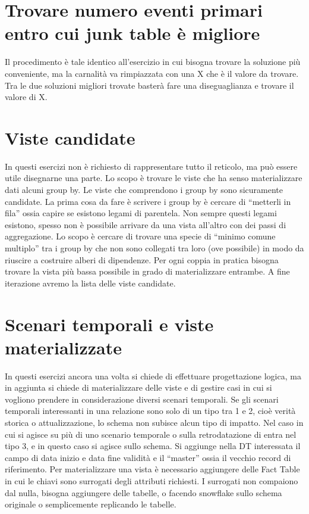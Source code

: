 \section{Trovare numero eventi primari entro cui junk table è migliore}
Il procedimento è tale identico all’esercizio in cui bisogna trovare la soluzione più conveniente, ma la carnalità va rimpiazzata con una X che è il valore da trovare. Tra le due soluzioni migliori trovate basterà fare una diseguaglianza e trovare il valore di X.
\section{Viste candidate}
In questi esercizi non è richiesto di rappresentare tutto il reticolo, ma può essere utile disegnarne una parte.  Lo scopo è trovare le viste che ha senso materializzare dati alcuni group by. Le viste che comprendono i group by sono sicuramente candidate. La prima cosa da fare è scrivere i group by è cercare di “metterli in fila” ossia capire se esistono legami di parentela. Non sempre questi legami esistono, spesso non è possibile arrivare da una vista all’altro con dei passi di aggregazione. Lo scopo è cercare di trovare una specie di “minimo comune multiplo” tra i group by che non sono collegati tra loro (ove possibile) in modo da riuscire a costruire alberi di dipendenze. Per ogni coppia in pratica bisogna trovare la vista più bassa possibile in grado di materializzare entrambe. A fine iterazione avremo la lista delle viste candidate.
\section{Scenari temporali e viste materializzate}
In questi esercizi ancora una volta si chiede di effettuare progettazione logica, ma in aggiunta si chiede di materializzare delle viste e di gestire casi in cui si vogliono prendere in considerazione diversi scenari temporali. Se gli scenari temporali interessanti in una relazione sono solo di un tipo tra 1 e 2, cioè verità storica o attualizzazione, lo schema non subisce alcun tipo di impatto. Nel caso in cui si agisce su più di uno scenario temporale o sulla retrodatazione di entra nel tipo 3, e in questo caso si agisce sullo schema. Si aggiunge nella DT interessata il campo di data inizio e data fine validità e il “master” ossia il vecchio record di riferimento. Per materializzare una vista è necessario aggiungere delle Fact Table in cui le chiavi sono surrogati degli attributi richiesti. I surrogati non compaiono dal nulla, bisogna aggiungere delle tabelle, o facendo snowflake sullo schema originale o semplicemente replicando le tabelle.
\newpage
